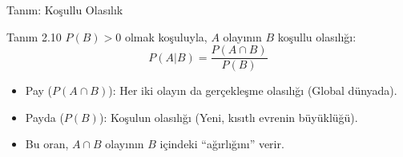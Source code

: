 \documentclass[light]{lutbeamer}
\begin{document}
\begin{frame}[fragile]{Tanım: Koşullu Olasılık}
    \begin{block}{Tanım 2.10}
        $P(B) > 0$ olmak koşuluyla, $A$ olayının $B$ koşullu olasılığı:
        \[ P(A|B) = \frac{P(A \cap B)}{P(B)} \]
    \end{block}

    \begin{itemize}
        \item Pay ($P(A \cap B)$): Her iki olayın da gerçekleşme olasılığı (Global dünyada).
        \item Payda ($P(B)$): Koşulun olasılığı (Yeni, kısıtlı evrenin büyüklüğü).
        \item Bu oran, $A \cap B$ olayının $B$ içindeki ``ağırlığını'' verir.
    \end{itemize}
\end{frame}
\end{document}
